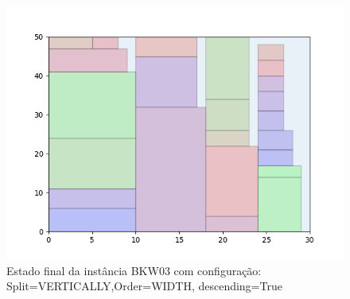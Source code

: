 \begin{figure}[H]
    \centering
    \caption[]{Estado final da instância BKW03 com configuração: Split=VERTICALLY,Order=WIDTH, descending=True}
    \label{fig:bkw03-vertically-width-true}
    \includegraphics[scale=0.5]{output/figures/bkw/bkw03/vertically/width/true/00}
\end{figure}